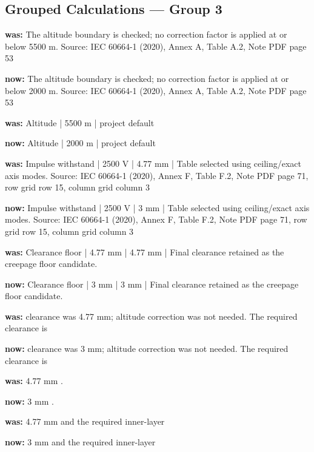 \documentclass[10pt]{article}
\begin{document}
\subsection*{Grouped Calculations — Group 3}
\textbf{was:} The altitude boundary is checked; no correction factor is applied at or below 5500 m. Source: IEC 60664-1 (2020), Annex A, Table A.2, Note PDF page 53\par
\textbf{now:} The altitude boundary is checked; no correction factor is applied at or below 2000 m. Source: IEC 60664-1 (2020), Annex A, Table A.2, Note PDF page 53\par
\textbf{was:} Altitude | 5500 m | project default\par
\textbf{now:} Altitude | 2000 m | project default\par
\textbf{was:} Impulse withstand | 2500 V | 4.77 mm | Table selected using ceiling/exact axis modes. Source: IEC 60664-1 (2020), Annex F, Table F.2, Note PDF page 71, row grid row 15, column grid column 3\par
\textbf{now:} Impulse withstand | 2500 V | 3 mm | Table selected using ceiling/exact axis modes. Source: IEC 60664-1 (2020), Annex F, Table F.2, Note PDF page 71, row grid row 15, column grid column 3\par
\textbf{was:} Clearance floor | 4.77 mm | 4.77 mm | Final clearance retained as the creepage floor candidate.\par
\textbf{now:} Clearance floor | 3 mm | 3 mm | Final clearance retained as the creepage floor candidate.\par
\textbf{was:} clearance was 4.77 mm; altitude correction was not needed. The required clearance is\par
\textbf{now:} clearance was 3 mm; altitude correction was not needed. The required clearance is\par
\textbf{was:} 4.77 mm .\par
\textbf{now:} 3 mm .\par
\textbf{was:} 4.77 mm and the required inner-layer\par
\textbf{now:} 3 mm and the required inner-layer\par
\end{document}
